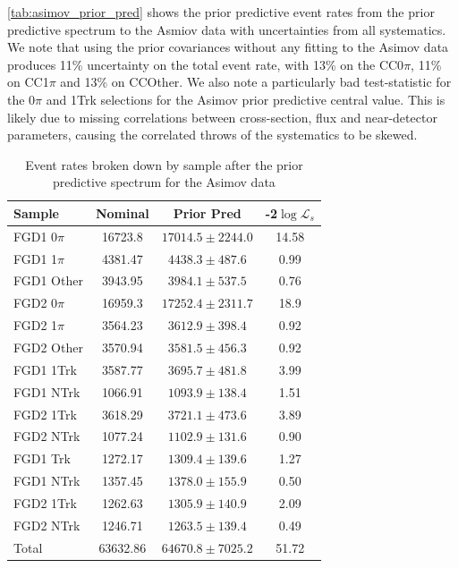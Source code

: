 \autoref{tab:asimov_prior_pred} shows the prior predictive event rates from the prior predictive spectrum to the Asmiov data with uncertainties from all systematics. We note that using the prior covariances without any fitting to the Asimov data produces 11\% uncertainty on the total event rate, with 13\% on the CC0$\pi$, 11\% on CC1$\pi$ and 13\% on CCOther. We also note a particularly bad test-statistic for the 0$\pi$ and 1Trk selections for the Asimov prior predictive central value. This is likely due to missing correlations between cross-section, flux and near-detector parameters, causing the correlated throws of the systematics to be skewed.
\begin{table}[h]
	\centering
	\begin{tabular}{l | c c | c}
		\hline
		\hline
		Sample & Nominal & Prior Pred & -2$\log\mathcal{L}_s$ \\ 
		\hline
		FGD1 0$\pi$ & 16723.8 &  $17014.5\pm2244.0$ &  14.58 \\
		FGD1 1$\pi$ & 4381.47 &  $4438.3\pm487.6$ &  0.99 \\
		FGD1 Other & 3943.95 &  $3984.1\pm537.5$  & 0.76\\
		
		FGD2 0$\pi$ & 16959.3 &  $17252.4\pm2311.7$ &  18.9 \\
		FGD2 1$\pi$ & 3564.23 &  $3612.9\pm398.4$ &  0.92 \\
		FGD2 Other & 3570.94 &  $3581.5\pm456.3$ &  0.92 \\
		\hline
		FGD1 1Trk & 3587.77 &  $3695.7\pm481.8$ &  3.99 \\
		FGD1 NTrk & 1066.91 &  $1093.9\pm138.4$ &  1.51  \\
		FGD2 1Trk & 3618.29 &  $3721.1\pm473.6$ &  3.89 \\
		FGD2 NTrk & 1077.24 &  $1102.9\pm131.6$ &  0.90 \\
		\hline
		FGD1 \numu 1 Trk & 1272.17 &  $1309.4\pm139.6$ &  1.27 \\
		FGD1 \numu NTrk & 1357.45 &  $1378.0\pm155.9$ &  0.50 \\
		FGD2 \numu 1Trk & 1262.63 &  $1305.9\pm140.9$ &  2.09 \\
		FGD2 \numu NTrk & 1246.71 &  $1263.5\pm139.4$ &  0.49 \\
		\hline
		Total & 63632.86 & $64670.8\pm7025.2$ & 51.72 \\
		\hline
		\hline
	\end{tabular}
	\caption{Event rates broken down by sample after the prior predictive spectrum for the Asimov data}
	\label{tab:asimov_prior_pred}
\end{table}

